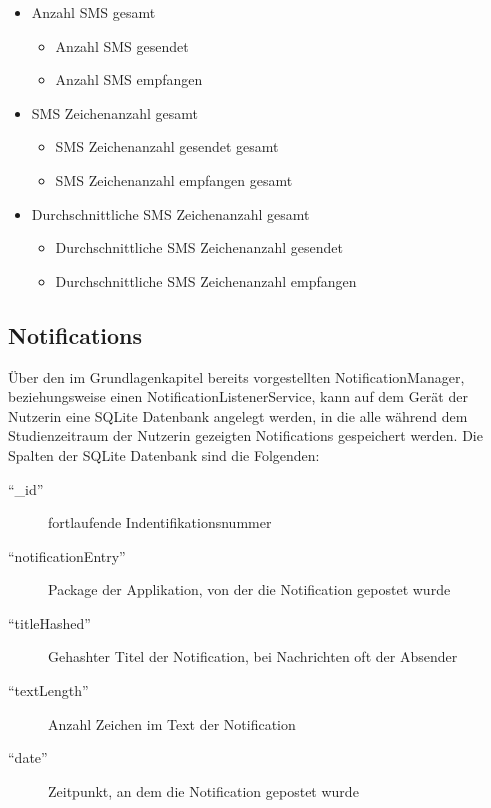\begin{itemize}
    \item Anzahl SMS gesamt
    \begin{itemize}
        \item Anzahl SMS gesendet
        \item Anzahl SMS empfangen
    \end{itemize}

    \item SMS Zeichenanzahl gesamt
    \begin{itemize}
        \item SMS Zeichenanzahl gesendet gesamt
        \item SMS Zeichenanzahl empfangen gesamt
    \end{itemize}

    \item Durchschnittliche SMS Zeichenanzahl gesamt
    \begin{itemize}
        \item Durchschnittliche SMS Zeichenanzahl gesendet
        \item Durchschnittliche SMS Zeichenanzahl empfangen
    \end{itemize}

\end{itemize}


\subsection{Notifications}


Über den im Grundlagenkapitel bereits vorgestellten NotificationManager, beziehungsweise einen NotificationListenerService, kann auf dem Gerät der Nutzerin eine SQLite Datenbank angelegt werden,
in die alle während dem Studienzeitraum der Nutzerin gezeigten Notifications gespeichert werden.
Die Spalten der SQLite Datenbank sind die Folgenden:
\begin{description}
    \item ["`\_id"'] fortlaufende Indentifikationsnummer
    \item ["`notificationEntry"'] Package der Applikation, von der die Notification gepostet wurde
    \item ["`titleHashed"'] Gehashter Titel der Notification, bei Nachrichten oft der Absender
    \item ["`textLength"'] Anzahl Zeichen im Text der Notification
    \item ["`date"'] Zeitpunkt, an dem die Notification gepostet wurde
\end{description}

